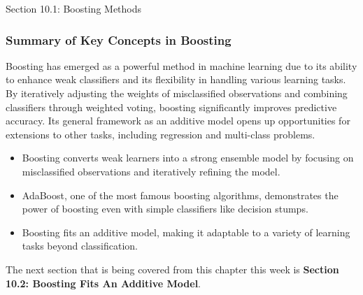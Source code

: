 \begin{notes}{Section 10.1: Boosting Methods}
    \subsubsection*{Summary of Key Concepts in Boosting}
    
    Boosting has emerged as a powerful method in machine learning due to its ability to enhance weak classifiers and its flexibility in handling various learning tasks. By iteratively adjusting the 
    weights of misclassified observations and combining classifiers through weighted voting, boosting significantly improves predictive accuracy. Its general framework as an additive model opens up 
    opportunities for extensions to other tasks, including regression and multi-class problems.
    
    \begin{highlight}
        \begin{itemize}
            \item Boosting converts weak learners into a strong ensemble model by focusing on misclassified observations and iteratively refining the model.
            \item AdaBoost, one of the most famous boosting algorithms, demonstrates the power of boosting even with simple classifiers like decision stumps.
            \item Boosting fits an additive model, making it adaptable to a variety of learning tasks beyond classification.
        \end{itemize}
    \end{highlight}
\end{notes}

The next section that is being covered from this chapter this week is \textbf{Section 10.2: Boosting Fits An Additive Model}.

